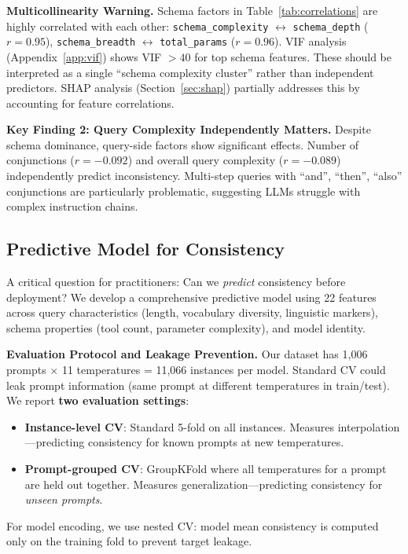 \documentclass[sigconf,anonymous,review]{acmart}
\begin{document}
\textbf{Multicollinearity Warning.} Schema factors in Table~\ref{tab:correlations} are highly correlated with each other: \texttt{schema\_complexity} $\leftrightarrow$ \texttt{schema\_depth} ($r=0.95$), \texttt{schema\_breadth} $\leftrightarrow$ \texttt{total\_params} ($r=0.96$). VIF analysis (Appendix~\ref{app:vif}) shows VIF $>40$ for top schema features. These should be interpreted as a single ``schema complexity cluster'' rather than independent predictors. SHAP analysis (Section~\ref{sec:shap}) partially addresses this by accounting for feature correlations.

\textbf{Key Finding 2: Query Complexity Independently Matters.} Despite schema dominance, query-side factors show significant effects. Number of conjunctions ($r = -0.092$) and overall query complexity ($r = -0.089$) independently predict inconsistency. Multi-step queries with ``and'', ``then'', ``also'' conjunctions are particularly problematic, suggesting LLMs struggle with complex instruction chains.

\subsection{Predictive Model for Consistency}

A critical question for practitioners: Can we \textit{predict} consistency before deployment? We develop a comprehensive predictive model using 22 features across query characteristics (length, vocabulary diversity, linguistic markers), schema properties (tool count, parameter complexity), and model identity.

\textbf{Evaluation Protocol and Leakage Prevention.} Our dataset has 1,006 prompts $\times$ 11 temperatures = 11,066 instances per model. Standard CV could leak prompt information (same prompt at different temperatures in train/test). We report \textbf{two evaluation settings}:
\begin{itemize}
    \item \textbf{Instance-level CV}: Standard 5-fold on all instances. Measures interpolation---predicting consistency for known prompts at new temperatures.
    \item \textbf{Prompt-grouped CV}: GroupKFold where all temperatures for a prompt are held out together. Measures generalization---predicting consistency for \textit{unseen prompts}.
\end{itemize}
For model encoding, we use nested CV: model mean consistency is computed only on the training fold to prevent target leakage.
\end{document}
